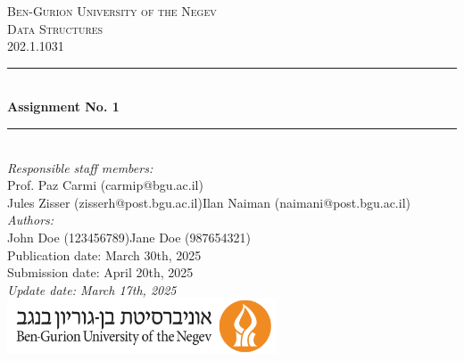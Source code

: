 \documentclass[a4paper]{article}
\theoremstyle{remarksStyle}
\theoremstyle{questionStyle}
\theoremstyle{answerStyle}
\begin{document}
\begin{titlepage}

\newcommand{\HRule}{\rule{\linewidth}{0.5mm}}                           %
\center 
 
\textsc{\LARGE Ben-Gurion University of the Negev}\\[1cm]

\textsc{\Large Data Structures}\\[0.2cm]
\textsc{\large 202.1.1031}\\[1cm]                                       %
\HRule \\[0.8cm]
{ \huge \bfseries Assignment No. 1}\\[0.7cm]                                %
\HRule \\[2cm]
\large
\emph{Responsible staff members:}\\
{Prof. Paz Carmi} (carmip@bgu.ac.il)\\
Jules Zisser (zisserh@post.bgu.ac.il)\quad\quad Ilan Naiman (naimani@post.bgu.ac.il)\\[1.5cm]       
\emph{Authors:}\\
John Doe (123456789)\quad Jane Doe (987654321)\\[1.5cm]
{\large Publication date: March 30th, 2025}\\
{\large Submission date: April 20th, 2025}\\[1cm]
{\large \it Update date: March 17th, 2025}\\[5cm]
\includegraphics[width=0.6\textwidth]{BGU-Icon.png}\\[1cm]  %
\vfill 
\end{titlepage}
\newpage
\end{document}
